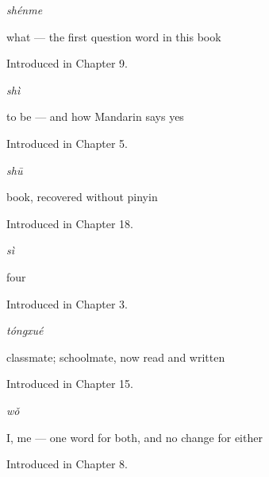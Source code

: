 \noindent\begin{minipage}[t]{\linewidth}
\raggedright
\textbf{}\enspace\emph{shénme}\par
\small what — the first question word in this book\par
\footnotesize Introduced in Chapter 9.
\end{minipage}\par\medskip

\noindent\begin{minipage}[t]{\linewidth}
\raggedright
\textbf{}\enspace\emph{shì}\par
\small to be — and how Mandarin says yes\par
\footnotesize Introduced in Chapter 5.
\end{minipage}\par\medskip

\noindent\begin{minipage}[t]{\linewidth}
\raggedright
\textbf{}\enspace\emph{shū}\par
\small book, recovered without pinyin\par
\footnotesize Introduced in Chapter 18.
\end{minipage}\par\medskip

\noindent\begin{minipage}[t]{\linewidth}
\raggedright
\textbf{}\enspace\emph{sì}\par
\small four\par
\footnotesize Introduced in Chapter 3.
\end{minipage}\par\medskip

\noindent\begin{minipage}[t]{\linewidth}
\raggedright
\textbf{}\enspace\emph{tóngxué}\par
\small classmate; schoolmate, now read and written\par
\footnotesize Introduced in Chapter 15.
\end{minipage}\par\medskip

\noindent\begin{minipage}[t]{\linewidth}
\raggedright
\textbf{}\enspace\emph{wǒ}\par
\small I, me — one word for both, and no change for either\par
\footnotesize Introduced in Chapter 8.
\end{minipage}\par\medskip

